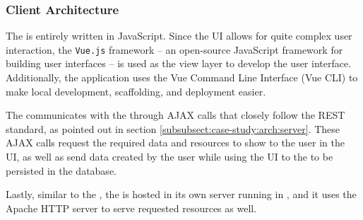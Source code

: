\subsubsection{Client Architecture} \label{subsubsect:case-study:arch:client}

The \mlblinkui is entirely written in JavaScript. Since the UI allows for quite complex user interaction, the \texttt{Vue.js} framework -- an open-source JavaScript framework for building user interfaces -- is used as the view layer to develop the user interface. Additionally, the application uses the Vue Command Line Interface (Vue CLI) to make local development, scaffolding, and deployment easier.

The \mlblinkui communicates with the \mlblinkapi through AJAX calls that closely follow the REST standard, as pointed out in section \ref{subsubsect:case-study:arch:server}. These AJAX calls request the required data and resources to show to the user in the UI, as well as send data created by the user while using the UI to the \mlblinkapi to be persisted in the database.

Lastly, similar to the \mlblinkapi, the \mlblinkui is hosted in its own server running in \ubuntu, and it uses the Apache HTTP server to serve requested resources as well.